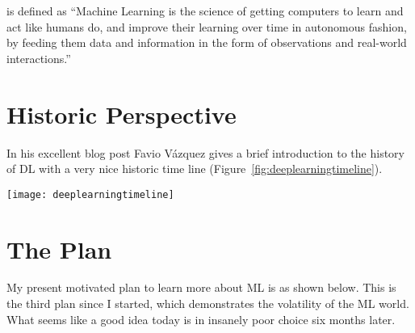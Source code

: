  is defined as\cite{DanielFaggella2019} ``Machine Learning is the science of getting computers to learn and act like humans do, and improve their learning over time in autonomous fashion, by feeding them data and information in the form of observations and real-world interactions.''


\section*{Historic Perspective}

In his excellent blog post \cite{Vazquez2018} Favio V\'{a}zquez gives a brief introduction to the history of \ac{DL} with a very nice historic time line (Figure~\ref{fig:deeplearningtimeline}).

\begin{figure*}[tph]
\texttt{[image: deeplearningtimeline]}
\caption{Favio V\'{a}zquez's \ac{DL} time line}
\label{fig:deeplearningtimeline}
\end{figure*}




\section*{The Plan}

My present motivated plan to learn more about \ac{ML} is as shown below. This is the third plan since I started, which demonstrates the volatility of the \ac{ML} world. What seems like a good idea today is in insanely poor choice six months later.

